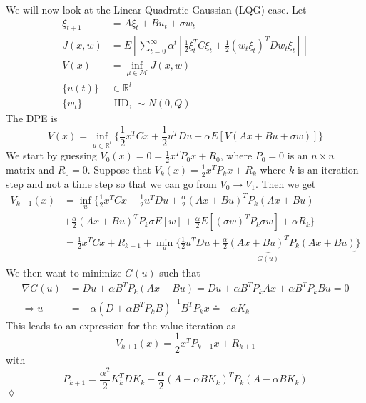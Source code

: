 \begin{example}
We will now look at the Linear Quadratic Gaussian (LQG) case. Let
\begin{align*}
\xi_{t+1} &= A\xi_t+Bu_t+\sigma w_t \\
J(x,w) &= E[\sum_{t=0}^\infty \alpha^t[\frac{1}{2}\xi_t^TC\xi_t + \frac{1}{2}(w_t\xi_t)^TDw_t\xi_t]] \\
V(x) &= \inf_{\mu\in\mathcal{M}}J(x,w) \\
\{u(t)\} &\in\mathbb{R}^l \\
\{w_t\} & \text{ IID, } \sim N(0,Q)
\end{align*}
The DPE is
$$V(x) = \inf_{u\in\mathbb{R}^l}\{\frac{1}{2}x^TCx + \frac{1}{2}u^TDu + \alpha E[V(Ax+Bu+\sigma w)]\}$$
We start by guessing $V_0(x)=0 = \frac{1}{2}x^TP_0x+R_0$, where $P_0=0$ is an $n\times n$ matrix and $R_0=0$. Suppose that $V_k(x) = \frac{1}{2}x^TP_kx+R_k$ where $k$ is an iteration step and not a time step so that we can go from $V_0\to V_1$. Then we get
\begin{align*}
V_{k+1}(x) &= \inf_u\{\frac{1}{2}x^TCx+\frac{1}{2}u^TDu + \frac{\alpha}{2}(Ax+Bu)^TP_k(Ax+Bu) \\
&+ \frac{\alpha}{2}(Ax+Bu)^TP_k\sigma E[w] + \frac{\alpha}{2}E[(\sigma w)^TP_k\sigma w] + \alpha R_k\} \\
&= \frac{1}{2}x^TCx + R_{k+1} + \min_u\{\underbrace{\frac{1}{2}u^TDu + \frac{\alpha}{2}(Ax+Bu)^TP_k(Ax+Bu)}_{G(u)}\}
\end{align*}
We then want to minimize $G(u)$ such that
\begin{align*}
\nabla G(u) &= Du+\alpha B^TP_k(Ax+Bu) = Du + \alpha B^TP_kAx + \alpha B^TP_kBu = 0 \\
\Rightarrow u &= -\alpha(D+\alpha B^TP_kB)^{-1}B^TP_kx \doteq -\alpha K_k
\end{align*}
This leads to an expression for the value iteration as
$$V_{k+1}(x) = \frac{1}{2}x^TP_{k+1}x + R_{k+1}$$
with
$$P_{k+1} = \frac{\alpha^2}{2}K_k^TDK_k + \frac{\alpha}{2}(A-\alpha BK_k)^TP_k(A-\alpha BK_k)$$
$\lozenge$
\end{example}

